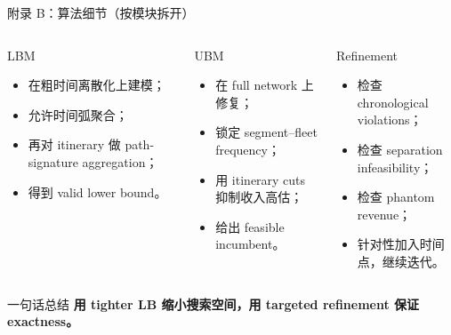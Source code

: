 \documentclass[aspectratio=169,11pt]{ctexbeamer}
\begin{document}
\begin{frame}{附录 B：算法细节（按模块拆开）}
\small
\begin{columns}[T,totalwidth=\textwidth]
\begin{block}{LBM}
\begin{itemize}
    \item 在粗时间离散化上建模；
    \item 允许时间弧聚合；
    \item 再对 itinerary 做 path-signature aggregation；
    \item 得到 valid lower bound。
\end{itemize}
\end{block}

\begin{block}{UBM}
\begin{itemize}
    \item 在 full network 上修复；
    \item 锁定 segment--fleet frequency；
    \item 用 itinerary cuts 抑制收入高估；
    \item 给出 feasible incumbent。
\end{itemize}
\end{block}

\begin{block}{Refinement}
\begin{itemize}
    \item 检查 chronological violations；
    \item 检查 separation infeasibility；
    \item 检查 phantom revenue；
    \item 针对性加入时间点，继续迭代。
\end{itemize}
\end{block}
\end{columns}

\vspace{0.2cm}
\begin{alertblock}{一句话总结}
\centering
\textbf{用 tighter LB 缩小搜索空间，用 targeted refinement 保证 exactness。}
\end{alertblock}
\end{frame}
\end{document}
